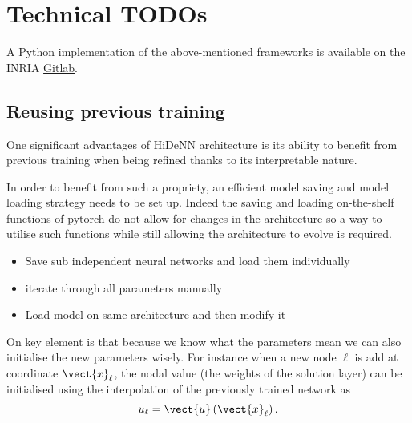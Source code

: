 \chapter[Technical TODOs]{Technical TODOs}

\begin{chapabstract}
    A Python implementation of the above-mentioned frameworks is available on the INRIA \href{https://gitlab.inria.fr/aldabyse/hidenn_1d}{Gitlab}.
\end{chapabstract}

\minitoc

\section{Reusing previous training}

One significant advantages of HiDeNN architecture is its ability to benefit from previous training when being refined thanks to its interpretable nature. 

In order to benefit from such a propriety, an efficient model saving and model loading strategy needs to be set up. Indeed the saving and loading on-the-shelf functions of pytorch do not allow for changes in the architecture so a way to utilise such functions while still allowing the architecture to evolve is required.

\begin{itemize}
    \item Save sub independent neural networks and load them individually
    \item iterate through all parameters manually 
    \item Load model on same architecture and then modify it
\end{itemize}

On key element is that because we know what the parameters mean we can also initialise the new parameters wisely. For instance when a new node $\ell$ is add at coordinate $\vect{x}_{\ell}$, the nodal value (the weights of the solution layer) can be initialised using the interpolation of the previously trained network as
\begin{equation}
    u_{\ell} = \vect{u}\left(\vect{x}_{\ell}\right).
\end{equation}

